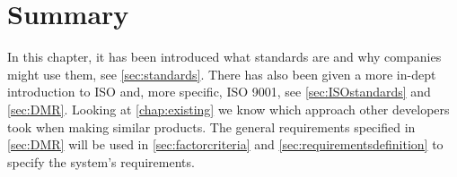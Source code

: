 \section{Summary}
In this chapter, it has been introduced what standards are and why companies might use them, see \cref{sec:standards}.
There has also been given a more in-dept introduction to ISO and, more specific, ISO 9001, see \cref{sec:ISOstandards} and \cref{sec:DMR}.
Looking at \ref{chap:existing} we know which approach other developers took when making similar products.
The general requirements specified in \cref{sec:DMR} will be used in \cref{sec:factorcriteria} and \cref{sec:requirementsdefinition} to specify the system's requirements.
